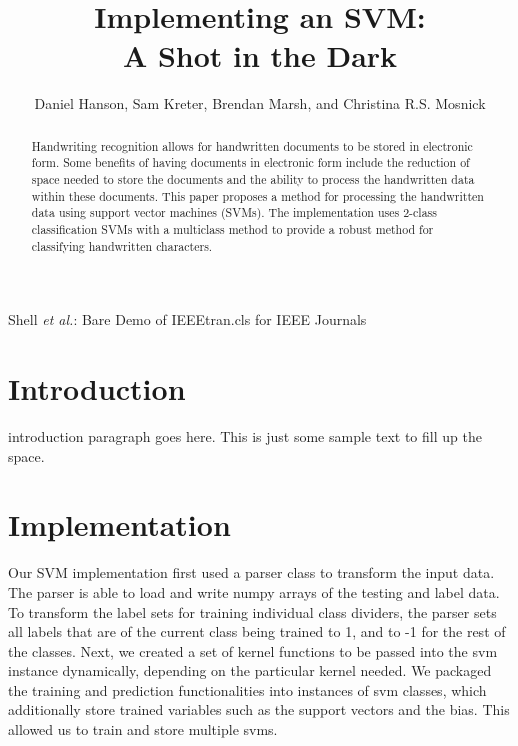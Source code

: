 \documentclass[journal]{IEEEtran}
\begin{document}
\title{Implementing an SVM:\\ A Shot in the Dark}

\author{Daniel Hanson, Sam Kreter, Brendan Marsh, and Christina R.S. Mosnick}

{Shell \MakeLowercase{\textit{et al.}}: Bare Demo of IEEEtran.cls for IEEE Journals}

\maketitle

\begin{abstract}
Handwriting recognition allows for handwritten documents to be stored in electronic form. Some benefits of having documents in electronic form include the reduction of space needed to store the documents and the ability to process the handwritten data within these documents. This paper proposes a method for processing the handwritten data using support vector machines (SVMs). The implementation uses 2-class classification SVMs with a multiclass method to provide a robust method for classifying handwritten characters.
\end{abstract}

\IEEEpeerreviewmaketitle

\section{Introduction}

 introduction paragraph goes here. This is just some sample text to fill up the space.



\section{Implementation}
    Our SVM implementation first used a parser class to transform the input data.  The parser is able to load and write numpy arrays of the testing and label data.  To transform the label sets for training individual class dividers, the parser sets all labels that are of the current class being trained to 1, and to -1 for the rest of the classes.  Next, we created a set of kernel functions to be passed into the svm instance dynamically, depending on the particular kernel needed.  We packaged the training and prediction functionalities into instances of svm classes, which additionally store trained variables such as the support vectors and the bias.  This allowed us to train and store multiple svms.\\
\end{document}
